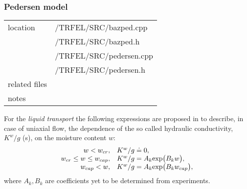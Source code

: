 \subsubsection{Pedersen model}

\begin{center}
\begin{tabular}{|l|l|}
\hline
location & /TRFEL/SRC/bazped.cpp\\
         & /TRFEL/SRC/bazped.h\\
         & /TRFEL/SRC/pedersen.cpp\\
         & /TRFEL/SRC/pedersen.h
\\ \hline
related files &
\\ \hline
notes & 
\\ \hline
\end{tabular}
\end{center}

For the {\it liquid transport} the following expressions are proposed in \cite{pedersen} to describe, 
in case of uniaxial flow, the dependence of the so called hydraulic conductivity, $K^w/g$ (s), 
on the moisture content $w$:
\begin{equation}\label{20}
\begin{array}{rl} 
w < w_{cr}, & K^w/g \doteq 0,\\
w_{cr} \leq w \leq w_{cap}, & K^w/g = A_k {\rm exp} \big(B_kw \big),\\
w_{cap} < w, & K^w/g = A_k {\rm exp} \big(B_kw_{cap} \big),
\end{array}
\end{equation}
where $A_k,B_k$ are coefficients yet to be determined from experiments.
